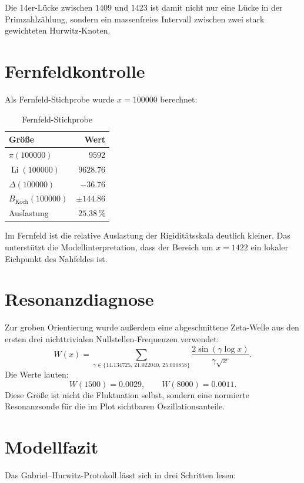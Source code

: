 \documentclass[11pt,a4paper]{article}
\newcommand{\Li}{\operatorname{Li}}
\newcommand{\piPrime}{\pi}
\newcommand{\Deviation}{\Delta}
\newcommand{\Koch}{B_{\mathrm{Koch}}}
\begin{document}
Die 14er-Lücke zwischen \(1409\) und \(1423\) ist damit nicht nur eine Lücke in
der Primzahlzählung, sondern ein massenfreies Intervall zwischen zwei stark
gewichteten Hurwitz-Knoten.

\section{Fernfeldkontrolle}

Als Fernfeld-Stichprobe wurde \(x=100000\) berechnet:

\begin{table}[htbp]
\centering
\caption{Fernfeld-Stichprobe}
\begin{tabular}{@{}lr@{}}
\toprule
Größe & Wert \\
\midrule
\(\piPrime(100000)\) & \(9592\) \\
\(\Li(100000)\) & \(\num{9628.76}\) \\
\(\Deviation(100000)\) & \(\num{-36.76}\) \\
\(\Koch(100000)\) & \(\pm\num{144.86}\) \\
Auslastung & \(\num{25.38}\,\%\) \\
\bottomrule
\end{tabular}
\end{table}

Im Fernfeld ist die relative Auslastung der Rigiditätsskala deutlich kleiner.
Das unterstützt die Modellinterpretation, dass der Bereich um \(x=1422\) ein
lokaler Eichpunkt des Nahfeldes ist.

\section{Resonanzdiagnose}

Zur groben Orientierung wurde außerdem eine abgeschnittene Zeta-Welle aus den
ersten drei nichttrivialen Nullstellen-Frequenzen verwendet:
\[
  W(x)=\sum_{\gamma\in\{14.134725,\,21.022040,\,25.010858\}}
  \frac{2\sin(\gamma\log x)}{\gamma\sqrt{x}}.
\]
Die Werte lauten:
\[
  W(1500)=\num{0.0029},\qquad W(8000)=\num{0.0011}.
\]
Diese Größe ist nicht die Fluktuation selbst, sondern eine normierte
Resonanzsonde für die im Plot sichtbaren Oszillationsanteile.

\section{Modellfazit}

Das Gabriel--Hurwitz-Protokoll lässt sich in drei Schritten lesen:
\end{document}
